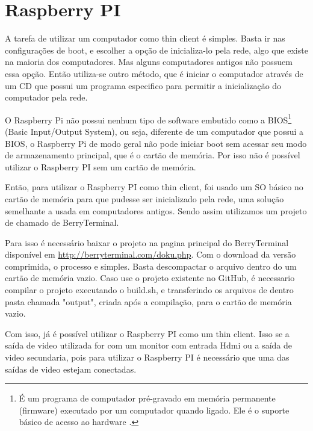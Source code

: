 \documentclass[
	12pt,				%
	openright,			%
	twoside,			%
	a4paper,			%
	chapter=TITLE,		%
	english,			%
	brazil				%
	]{abntex2}
\begin{document}
\chapter{Raspberry PI}
\label{confRasp}

A tarefa de utilizar um computador como thin client é simples. Basta ir nas configurações de boot, e escolher a opção de inicializa-lo pela rede, algo que existe na maioria dos computadores. Mas alguns computadores antigos não possuem essa opção. Então utiliza-se outro método, que é iniciar o computador através de um CD que possui um programa especifico para permitir a inicialização do computador pela rede.

O Raspberry Pi não possui nenhum tipo de software embutido como a BIOS\footnote{É um programa de computador pré-gravado em memória permanente (firmware) executado por um computador quando ligado. Ele é o suporte básico de acesso ao hardware \cite{bios}.} (Basic Input/Output System), ou seja, diferente de um computador que possui a BIOS, o Raspberry Pi de modo geral não pode iniciar boot sem acessar seu modo de armazenamento principal, que é o cartão de memória. Por isso não é possível utilizar o Raspberry PI sem um cartão de memória.

	Então, para utilizar o Raspberry PI como thin client, foi usado um SO básico no cartão de memória para que pudesse ser inicializado pela rede, uma solução semelhante a usada em computadores antigos. Sendo assim utilizamos um projeto de chamado de BerryTerminal. 
	
Para isso é necessário baixar o projeto na pagina principal do BerryTerminal  disponível em \url{http://berryterminal.com/doku.php}. Com o download da versão comprimida, o processo e simples. Basta descompactar o arquivo dentro do um cartão de memória vazio. Caso use o projeto existente no GitHub, é necessario compilar o projeto executando o build.sh, e transferindo os arquivos de dentro pasta chamada "output", criada após a compilação, para o cartão de memória vazio.

Com isso, já é possível utilizar o Raspberry PI como um thin client. Isso se a saída de video utilizada for com um monitor com entrada Hdmi ou a saída de video secundaria, pois para utilizar o Raspberry PI é necessário que uma das saídas de  video estejam conectadas.
\end{document}
